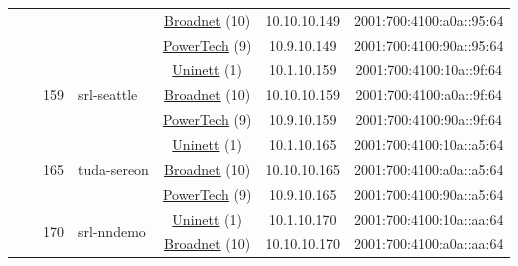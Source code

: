 \begin{small}
\begin{center}
\begin{longtable}{|c|c|c|c|c|c|c|c|}
  &  &  &  & \multicolumn{2}{|c|}{\tiny{\href{https://www.broadnet.no}{Broadnet} (10)}} & \tiny{10.10.10.149} & \tiny{2001:700:4100:a0a::95:64} \\* \cline{5-5}\cline{6-6}\cline{7-7}\cline{8-8}
  &  &  &  & \multicolumn{2}{|c|}{\tiny{\href{http://www.powertech.no}{PowerTech} (9)}} & \tiny{10.9.10.149} & \tiny{2001:700:4100:90a::95:64} \\* \cline{3-3}\cline{4-4}\cline{5-5}\cline{6-6}\cline{7-7}\cline{8-8}
  &  & \multirow{3}{*}{\tiny{159}} & \multicolumn{1}{|l|}{\multirow{3}{*}{\tiny{srl-seattle}}} & \multicolumn{2}{|c|}{\tiny{\href{https://www.uninett.no}{Uninett} (1)}} & \tiny{10.1.10.159} & \tiny{2001:700:4100:10a::9f:64} \\* \cline{5-5}\cline{6-6}\cline{7-7}\cline{8-8}
  &  &  &  & \multicolumn{2}{|c|}{\tiny{\href{https://www.broadnet.no}{Broadnet} (10)}} & \tiny{10.10.10.159} & \tiny{2001:700:4100:a0a::9f:64} \\* \cline{5-5}\cline{6-6}\cline{7-7}\cline{8-8}
  &  &  &  & \multicolumn{2}{|c|}{\tiny{\href{http://www.powertech.no}{PowerTech} (9)}} & \tiny{10.9.10.159} & \tiny{2001:700:4100:90a::9f:64} \\* \cline{3-3}\cline{4-4}\cline{5-5}\cline{6-6}\cline{7-7}\cline{8-8}
  &  & \multirow{3}{*}{\tiny{165}} & \multicolumn{1}{|l|}{\multirow{3}{*}{\tiny{tuda-sereon}}} & \multicolumn{2}{|c|}{\tiny{\href{https://www.uninett.no}{Uninett} (1)}} & \tiny{10.1.10.165} & \tiny{2001:700:4100:10a::a5:64} \\* \cline{5-5}\cline{6-6}\cline{7-7}\cline{8-8}
  &  &  &  & \multicolumn{2}{|c|}{\tiny{\href{https://www.broadnet.no}{Broadnet} (10)}} & \tiny{10.10.10.165} & \tiny{2001:700:4100:a0a::a5:64} \\* \cline{5-5}\cline{6-6}\cline{7-7}\cline{8-8}
  &  &  &  & \multicolumn{2}{|c|}{\tiny{\href{http://www.powertech.no}{PowerTech} (9)}} & \tiny{10.9.10.165} & \tiny{2001:700:4100:90a::a5:64} \\* \cline{3-3}\cline{4-4}\cline{5-5}\cline{6-6}\cline{7-7}\cline{8-8}
  &  & \multirow{3}{*}{\tiny{170}} & \multicolumn{1}{|l|}{\multirow{3}{*}{\tiny{srl-nndemo}}} & \multicolumn{2}{|c|}{\tiny{\href{https://www.uninett.no}{Uninett} (1)}} & \tiny{10.1.10.170} & \tiny{2001:700:4100:10a::aa:64} \\* \cline{5-5}\cline{6-6}\cline{7-7}\cline{8-8}
  &  &  &  & \multicolumn{2}{|c|}{\tiny{\href{https://www.broadnet.no}{Broadnet} (10)}} & \tiny{10.10.10.170} & \tiny{2001:700:4100:a0a::aa:64} \\* \cline{5-5}\cline{6-6}\cline{7-7}\cline{8-8}

\end{longtable}
\end{center}
\end{small}
